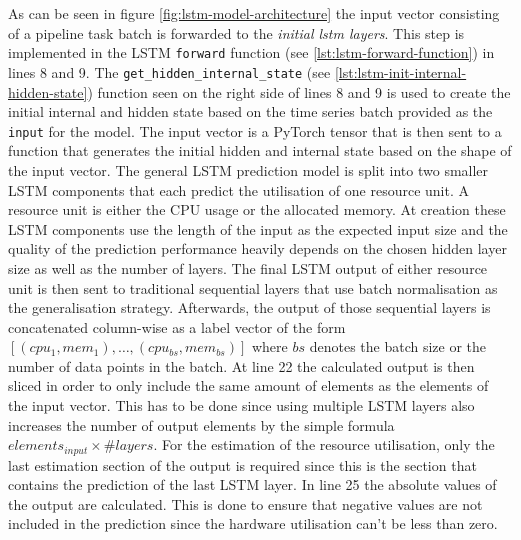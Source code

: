   


  As can be seen in figure \ref{fig:lstm-model-architecture} the input vector consisting of a pipeline task batch is forwarded to the \emph{initial lstm layers}. This step is implemented in the LSTM \texttt{forward} function (see \ref{lst:lstm-forward-function}) in lines 8 and 9. The \texttt{get\_hidden\_internal\_state} (see \ref{lst:lstm-init-internal-hidden-state}) function seen on the right side of lines 8 and 9 is used to create the initial internal and hidden state based on the time series batch provided as the \texttt{input} for the model. The input vector is a PyTorch tensor that is then sent to a function that generates the initial hidden and internal state based on the shape of the input vector.
  The general LSTM prediction model is split into two smaller LSTM components that each predict the utilisation of one resource unit. A resource unit is either the CPU usage or the allocated memory. At creation these LSTM components use the length of the input as the expected input size and the quality of the prediction performance heavily depends on the chosen hidden layer size as well as the number of  layers.
  The final LSTM output of either resource unit is then sent to traditional sequential layers that use batch normalisation as the generalisation strategy.
  Afterwards, the output of those sequential layers is concatenated column-wise as a label vector of the form $\left[(cpu_1, mem_1), \dots, (cpu_{bs}, mem_{bs})\right]$ where $bs$ denotes the batch size or the number of data points in the batch.
  At line 22 the calculated output is then sliced in order to only include the same amount of elements as the elements of the input vector. This has to be done since using multiple LSTM layers also increases the number of output elements by the simple formula $elements_{input} \times \#layers$. For the estimation of the resource utilisation, only the last estimation section of the output is required since this is the section that contains the prediction of the last LSTM layer.
  In line 25 the absolute values of the output are calculated. This is done to ensure that negative values are not included in the prediction since the hardware utilisation can't be less than zero.
  
